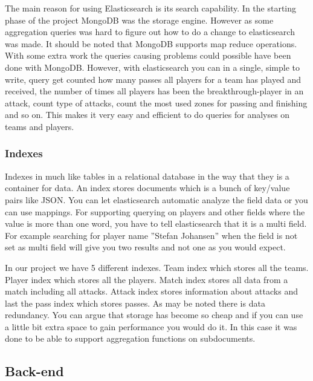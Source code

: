 The main reason for using Elasticsearch is its search capability. In the starting phase of the project MongoDB \footnotemark was the storage engine. However as some aggregation queries was hard to figure out how to do a change to elasticsearch was made. It should be noted that MongoDB supports map reduce operations. With some extra work the queries causing problems could possible have been done with MongoDB. However, with elasticsearch you can in a single, simple to write, query get counted how many passes all players for a team has played and received, the number of times all players has been the breakthrough-player in an attack, count type of attacks, count the most used zones for passing and finishing and so on. This makes it very easy and efficient to do queries for analyses on teams and players.  


\subsubsection{Indexes}

Indexes in much like tables in a relational database in the way that they is a container for data. An index stores documents which is a bunch of key/value pairs like JSON. You can let elasticsearch automatic analyze the field data or you can use mappings. For supporting querying on players and other fields where the value is more than one word, you have to tell elasticsearch that it is a multi field. For example searching for player name ''Stefan Johansen'' when the field is not set as multi field will give you two results and not one as you would expect.

In our project we have 5 different indexes. Team index which stores all the teams. Player index which stores all the players. Match index stores all data from a match including all attacks. Attack index stores information about attacks and last the pass index which stores passes. As may be noted there is data redundancy. You can argue that storage has become so cheap and if you can use a little bit extra space to gain performance you would do it. In this case it was done to be able to support aggregation functions on subdocuments.

\subsection{Back-end}

